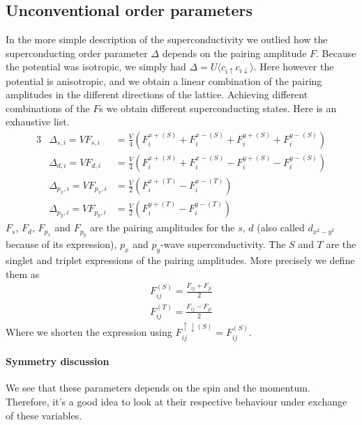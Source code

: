 \documentclass[../main.tex]{subfile}
\begin{document}
\subsection{Unconventional order parameters}
In the more simple description of the superconductivity we outlied how the superconducting order parameter $\Delta$ depends on the pairing amplitude $F$.
Because the potential was isotropic, we simply had $\Delta = U \langle c_{i\uparrow}c_{i\downarrow}\rangle$. Here however the potential is anisotropic, 
and we obtain a linear combination of the pairing amplitudes in the different directions of the lattice. Achieving different combinations of the $F$s 
we obtain different superconducting states. Here is an exhaustive list.
\begin{alignat}{3}
    &\Delta_{s,i} = V F_{s,i} &= \frac{V}{4} \left(F_{i}^{x+(S)} + F_{i}^{x-(S)} + F_{i}^{y+(S)} + F_{i}^{y-(S)}\right)\\
    &\Delta_{d,i} = V F_{d,i} &= \frac{V}{4} \left(F_{i}^{x+(S)} + F_{i}^{x-(S)} - F_{i}^{y+(S)} - F_{i}^{y-(S)}\right)\\
    &\Delta_{p_x,i} = V F_{p_x,i} &= \frac{V}{2} \left(F_{i}^{x+(T)} - F_{i}^{x-(T)}\right)\\
    &\Delta_{p_y,i} = V F_{p_y,i} &= \frac{V}{2} \left(F_{i}^{y+(T)} - F_{i}^{y-(T)}\right)
\end{alignat}
$F_s$, $F_d$, $F_{p_x}$ and $F_{p_y}$ are the pairing amplitudes for the $s$, $d$ (also called $d_{x^2-y^2}$ because of its expression), $p_x$ and $p_y$-wave superconductivity.
The $S$ and $T$ are the singlet and triplet expressions of the pairing amplitudes. More precisely we define them as
\begin{align}
    F_{ij}^{(S)} = \frac{F_{ij} + F_{ji}}{2} \\
    F_{ij}^{(T)} = \frac{F_{ij} - F_{ji}}{2}
\end{align}
Where we shorten the expression using $F_{ij}^{\uparrow\downarrow(S)} = F_{ij}^{(S)}$.
\paragraph{Symmetry discussion} $~$\\

We see that these parameters depends on the spin and the momentum. Therefore, it's a good idea to look at their respective
behaviour under exchange of these variables.\\
\end{document}
